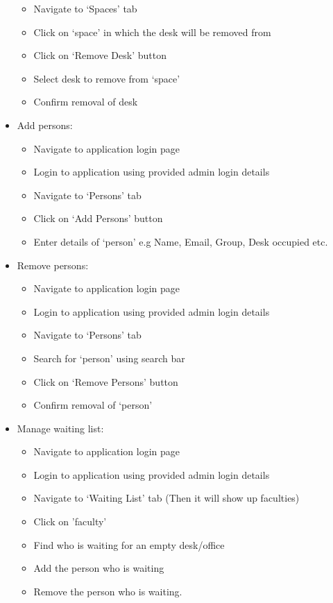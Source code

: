 \documentclass[11pt,a4paper]{article}
\begin{document}
\begin{itemize}
\begin{itemize}
      \item Navigate to ‘Spaces’ tab
      \item Click on ‘space’ in which the desk will be removed from
      \item Click on ‘Remove Desk’ button
      \item Select desk to remove from ‘space’
      \item Confirm removal of desk
    \end{itemize}
  \item Add persons:
    \begin{itemize}
      \item Navigate to application login page
      \item Login to application using provided admin login details
      \item Navigate to ‘Persons’ tab
      \item Click on ‘Add Persons’ button
      \item Enter details of ‘person’ e.g Name, Email, Group, Desk occupied etc.
    \end{itemize}
  \item Remove persons:
    \begin{itemize}
      \item Navigate to application login page
      \item Login to application using provided admin login details
      \item Navigate to ‘Persons’ tab
      \item Search for ‘person’ using search bar
      \item Click on ‘Remove Persons’ button
      \item Confirm removal of ‘person’
    \end{itemize}
  \item Manage waiting list:
    \begin{itemize}
      \item Navigate to application login page
      \item Login to application using provided admin login details
      \item Navigate to ‘Waiting List’ tab (Then it will show up faculties)
      \item Click on 'faculty'
      \item Find who is waiting for an empty desk/office
      \item Add the person who is waiting
      \item Remove the person who is waiting.

\end{itemize}
\end{itemize}
\end{document}
